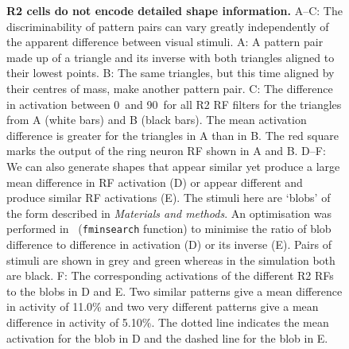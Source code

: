 \begin{figure}[htp]
	\caption{
		{\bf R2 cells do not encode detailed shape information.}
		A--C: The discriminability of pattern pairs can vary greatly independently of the apparent difference between visual stimuli.
		A: A pattern pair made up of a triangle and its inverse with both triangles aligned to their lowest points.
		B: The same triangles, but this time aligned by their centres of mass, make another pattern pair.
		C: The difference in activation between 0\degree\ and 90\degree\ for all R2 RF filters for the triangles from A (white bars) and B (black bars). The mean activation difference is greater for the triangles in A than in B. The red square marks the output of the ring neuron \ac{RF} shown in A and B. 
		D--F: We can also generate shapes that appear similar yet produce a large mean difference in RF activation (D) or appear different and produce similar RF activations (E). The stimuli here are `blobs' of the form described in \emph{Materials and methods}. An optimisation was performed in \Matlab\ (\texttt{fminsearch} function) to minimise the ratio of blob difference to difference in activation (D) or its inverse (E). Pairs of stimuli are shown in grey and green whereas in the simulation both are black.
		F: The corresponding activations of the different R2 RFs to the blobs in D and E. Two similar patterns give a mean difference in activity of 11.0\% and two very different patterns give a mean difference in activity of 5.10\%. The dotted line indicates the mean activation for the blob in D and the dashed line for the blob in E.
	}
	\label{fig:simdiffpatts}
\end{figure}

